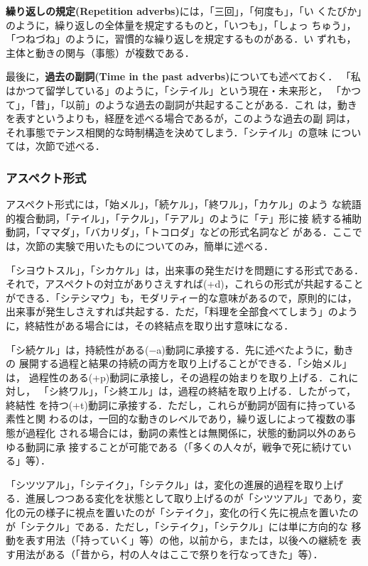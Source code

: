 {\bf 繰り返しの規定(Repetition adverbs)}には，「三回」，「何度も」，「い
くたびか」のように，繰り返しの全体量を規定するものと，「いつも」，「しょっ
ちゅう」，「つねづね」のように，習慣的な繰り返しを規定するものがある．い
ずれも，主体と動きの関与（事態）が複数である．

最後に，{\bf 過去の副詞(Time in the past adverbs)}についても述べておく．
「私はかつて留学している」のように，「シテイル」という現在・未来形と，
「かつて」，「昔」，「以前」のような過去の副詞が共起することがある．これ
は，動きを表すというよりも，経歴を述べる場合であるが，このような過去の副
詞は，それ事態でテンス相関的な時制構造を決めてしまう．「シテイル」の意味
については，次節で述べる．

\subsubsection{アスペクト形式}

アスペクト形式には，「始メル」，「続ケル」，「終ワル」，「カケル」のよう
な統語的複合動詞，「テイル」，「テクル」，「テアル」のように「テ」形に接
続する補助動詞，「ママダ」，「バカリダ」，「トコロダ」などの形式名詞など
がある．ここでは，次節の実験で用いたものについてのみ，簡単に述べる．

「シヨウトスル」，「シカケル」は，出来事の発生だけを問題にする形式である．
それで，アスペクトの対立がありさえすれば(+d)，これらの形式が共起すること
ができる．「シテシマウ」も，モダリティー的な意味があるので，原則的には，
出来事が発生しさえすれば共起する．ただ，「料理を全部食べてしまう」のよう
に，終結性がある場合には，その終結点を取り出す意味になる．

「シ続ケル」は，持続性がある($-$a)動詞に承接する．先に述べたように，動きの
展開する過程と結果の持続の両方を取り上げることができる．「シ始メル」は，
過程性のある(+p)動詞に承接し，その過程の始まりを取り上げる．これに対し，
「シ終ワル」，「シ終エル」は，過程の終結を取り上げる．したがって，終結性
を持つ(+t)動詞に承接する．ただし，これらが動詞が固有に持っている素性と関
わるのは，一回的な動きのレベルであり，繰り返しによって複数の事態が過程化
される場合には，動詞の素性とは無関係に，状態的動詞以外のあらゆる動詞に承
接することが可能である（「多くの人々が，戦争で死に続けている」等）．

「シツツアル」，「シテイク」，「シテクル」は，変化の進展的過程を取り上げ
る．進展しつつある変化を状態として取り上げるのが「シツツアル」であり，変
化の元の様子に視点を置いたのが「シテイク」，変化の行く先に視点を置いたの
が「シテクル」である．ただし，「シテイク」，「シテクル」には単に方向的な
移動を表す用法（「持っていく」等）の他，以前から，または，以後への継続を
表す用法がある（「昔から，村の人々はここで祭りを行なってきた」等）．

